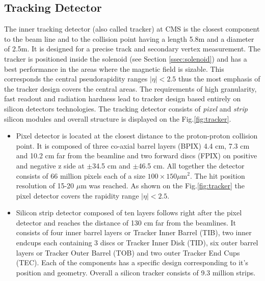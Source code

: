 \subsection{Tracking Detector}

The inner tracking detector\cite{TrackerTDR, CMSatLHC} (also called tracker) at CMS is the closest component to the beam line and to the collision point having a
length 5.8m and a diameter of 2.5m. It is designed for a precise track and secondary vertex measurement. 
The tracker is positioned inside the solenoid (see Section \ref{ssec:solenoid}) and has a best performance in the areas where the magnetic field
is sizable. This corresponds the central pseudorapidity ranges $|\eta| < 2.5$ thus the most emphasis of the tracker design covers the central
areas. The requirements of high granularity, fast readout and radiation hardness lead to tracker design based entirely on silicon
detectors technologies. The tracking detector consists of \textit{pixel} and \textit{strip} silicon modules
and overall structure is displayed on the Fig.\ref{fig:tracker}.

\begin{itemize}
 \item Pixel detector is located at the closest distance to the proton-proton collision point. It is composed of three co-axial barrel layers (BPIX)
 4.4 cm, 7.3 cm and 10.2 cm far from the beamline and two forward discs (FPIX) on positive and negative z side
 at $\pm$34.5 cm and $\pm$46.5 cm. All together the detector consists of 66 million pixels each of a size $100 \times 150 \mu$m$^2$. The hit
 position resolution of 15-20 $\mu$m was reached\cite{TrackPerf}.
 As shown on the Fig.\ref{fig:tracker} the pixel detector covers the rapidity range $|\eta| < 2.5$.
 
 \item Silicon strip detector composed of ten layers follows right after the pixel detector and reaches the distance of 130 cm far
 from the beamlines. It consists of four inner barrel layers or Tracker Inner Barrel (TIB), two inner endcups each containing 3 discs
 or Tracker Inner Disk (TID), six outer barrel layers or Tracker Outer Barrel (TOB) and two outer Tracker End Cups (TEC).
 Each of the components has a specific design corresponding to it's position and geometry. Overall a silicon tracker consists of 9.3
 million strips.
\end{itemize}

